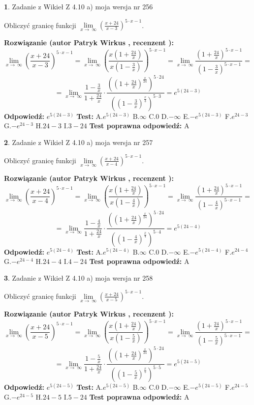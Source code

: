 \documentclass[12pt, a4paper]{article}
\theoremstyle{definition} %
\newtheorem{zad}{}
\newcommand{\zadStart}[1]{\begin{zad}#1\newline}
\newcommand{\zadStop}{\end{zad}}
\newcommand{\rozwStart}[2]{\noindent \textbf{Rozwiązanie (autor #1 , recenzent #2): }\newline}
\newcommand{\rozwStop}{\newline}
\newcommand{\odpStart}{\noindent \textbf{Odpowiedź:}\newline}
\newcommand{\odpStop}{\newline}
\newcommand{\testStart}{\noindent \textbf{Test:}\newline}
\newcommand{\testStop}{\newline}
\newcommand{\kluczStart}{\noindent \textbf{Test poprawna odpowiedź:}\newline}
\newcommand{\kluczStop}{\newline}
\begin{document}
\zadStart{Zadanie z Wikieł Z 4.10 a) moja wersja nr 256}


Obliczyć granicę funkcji  $\lim\limits_{x\to\ \infty}(\frac{x+24}{x-3})^{5\cdot x-1}$.
\zadStop
\rozwStart{Patryk Wirkus}{}
$$\lim\limits_{x\to\ \infty}(\frac{x+24}{x-3})^{5\cdot x-1} = \lim\limits_{x\to\ \infty}(\frac{x(1+\frac{24}{x})}{x(1-\frac{3}{x})})^{5\cdot x-1}=\lim\limits_{x\to\ \infty}\frac{(1+\frac{24}{x})^{5\cdot x-1}}{(1-\frac{3}{x})^{5\cdot x-1}}=$$
$$=\lim\limits_{x\to\ \infty}\frac{1-\frac{3}{x}}{1+\frac{24}{x}}\cdot\frac{((1+\frac{24}{x})^{\frac{x}{24}})^{5\cdot24}}{((1-\frac{3}{x})^{\frac{x}{3}})^{5\cdot3}}=e^{5(24-3)}$$
\rozwStop
\odpStart
$e^{5(24-3)}$
\odpStop
\testStart
A.$e^{5(24-3)}$ B.$\infty$ C.$0$ D.$-\infty$ E.$-e^{5(24-3)}$
F.$e^{24-3}$ G.$-e^{24-3}$
H.$24-3$
I.$3-24$
\testStop
\kluczStart
A
\kluczStop



\zadStart{Zadanie z Wikieł Z 4.10 a) moja wersja nr 257}


Obliczyć granicę funkcji  $\lim\limits_{x\to\ \infty}(\frac{x+24}{x-4})^{5\cdot x-1}$.
\zadStop
\rozwStart{Patryk Wirkus}{}
$$\lim\limits_{x\to\ \infty}(\frac{x+24}{x-4})^{5\cdot x-1} = \lim\limits_{x\to\ \infty}(\frac{x(1+\frac{24}{x})}{x(1-\frac{4}{x})})^{5\cdot x-1}=\lim\limits_{x\to\ \infty}\frac{(1+\frac{24}{x})^{5\cdot x-1}}{(1-\frac{4}{x})^{5\cdot x-1}}=$$
$$=\lim\limits_{x\to\ \infty}\frac{1-\frac{4}{x}}{1+\frac{24}{x}}\cdot\frac{((1+\frac{24}{x})^{\frac{x}{24}})^{5\cdot24}}{((1-\frac{4}{x})^{\frac{x}{4}})^{5\cdot4}}=e^{5(24-4)}$$
\rozwStop
\odpStart
$e^{5(24-4)}$
\odpStop
\testStart
A.$e^{5(24-4)}$ B.$\infty$ C.$0$ D.$-\infty$ E.$-e^{5(24-4)}$
F.$e^{24-4}$ G.$-e^{24-4}$
H.$24-4$
I.$4-24$
\testStop
\kluczStart
A
\kluczStop



\zadStart{Zadanie z Wikieł Z 4.10 a) moja wersja nr 258}


Obliczyć granicę funkcji  $\lim\limits_{x\to\ \infty}(\frac{x+24}{x-5})^{5\cdot x-1}$.
\zadStop
\rozwStart{Patryk Wirkus}{}
$$\lim\limits_{x\to\ \infty}(\frac{x+24}{x-5})^{5\cdot x-1} = \lim\limits_{x\to\ \infty}(\frac{x(1+\frac{24}{x})}{x(1-\frac{5}{x})})^{5\cdot x-1}=\lim\limits_{x\to\ \infty}\frac{(1+\frac{24}{x})^{5\cdot x-1}}{(1-\frac{5}{x})^{5\cdot x-1}}=$$
$$=\lim\limits_{x\to\ \infty}\frac{1-\frac{5}{x}}{1+\frac{24}{x}}\cdot\frac{((1+\frac{24}{x})^{\frac{x}{24}})^{5\cdot24}}{((1-\frac{5}{x})^{\frac{x}{5}})^{5\cdot5}}=e^{5(24-5)}$$
\rozwStop
\odpStart
$e^{5(24-5)}$
\odpStop
\testStart
A.$e^{5(24-5)}$ B.$\infty$ C.$0$ D.$-\infty$ E.$-e^{5(24-5)}$
F.$e^{24-5}$ G.$-e^{24-5}$
H.$24-5$
I.$5-24$
\testStop
\kluczStart
A
\kluczStop
\end{document}

